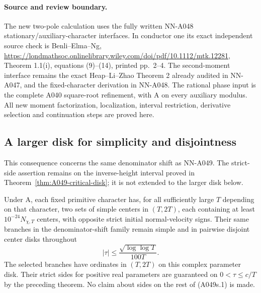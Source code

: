 \paragraph{Source and review boundary.}
The new two-pole calculation uses the fully written NN-A048
stationary/auxiliary-character interfaces. In conductor one
its exact independent source check is Benli--Elma--Ng,
\url{https://londmathsoc.onlinelibrary.wiley.com/doi/pdf/10.1112/mtk.12281},
Theorem 1.1(i), equations (9)--(14), printed pp.~2--4. The
second-moment interface remains the exact Heap--Li--Zhao
Theorem 2 already audited in NN-A047, and the fixed-character
derivation in NN-A048. The rational phase input is the complete
A040 square-root refinement, with A on every auxiliary modulus.
All new moment factorization, localization, interval restriction,
derivative selection and continuation steps are proved here.


\subsection*{A larger disk for simplicity and disjointness}

This consequence concerns the same denominator shift as NN-A049.
The strict-side assertion remains on the inverse-height interval
proved in Theorem~\ref{thm:A049-critical-disk}; it is not extended
to the larger disk below.

\begin{corollary}
\label{cor:A049-loglog-survival}
Under A, each fixed primitive character has, for all sufficiently
large $T$ depending on that character, two sets of simple centers
in $(T,2T)$, each containing at least $10^{-24}N_{\chi,T}$ centers,
with opposite strict initial normal-velocity signs. Their same
branches in the denominator-shift family remain simple and in
pairwise disjoint center disks throughout
\[
               |\tau|\le\frac{\sqrt{\log\log T}}{100T}.
\tag{A049s.1}
\]
The selected branches have ordinates in $(T,2T)$ on this complex
parameter disk. Their strict sides for positive real parameters
are guaranteed on $0<\tau\le c/T$ by the preceding theorem.
No claim about sides on the rest of (A049s.1) is made.
\end{corollary}

